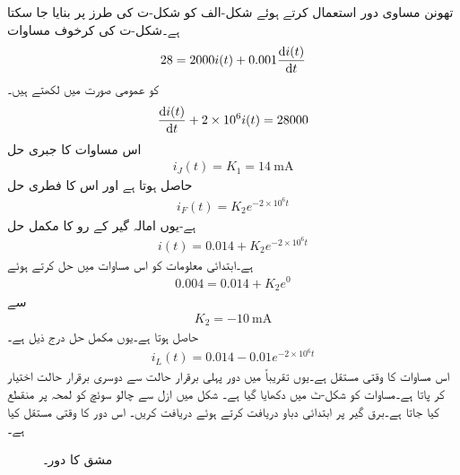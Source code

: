 تھونن مساوی دور استعمال کرتے ہوئے شکل-الف کو شکل-ت کی طرز پر بنایا جا سکتا ہے۔شکل-ت کی کرخوف مساوات
\begin{align*}
28=2000 i(t)+0.001 \frac{\dif i(t)}{\dif t}
\end{align*}
کو عمومی صورت میں لکھتے ہیں۔
\begin{align*}
\frac{\dif i(t)}{\dif t}+2\times 10^6 i(t)=28000
\end{align*}
اس مساوات کا جبری حل 
\begin{align*}
i_J(t)=K_1=\SI{14}{\milli\ampere}
\end{align*}
حاصل ہوتا ہے اور اس کا فطری حل
\begin{align*}
i_F(t)=K_2 e^{-2\times 10^6 t}
\end{align*}
ہے-یوں امالہ گیر کے رو کا مکمل حل
\begin{align*}
i(t)=0.014+K_2 e^{-2\times 10^6 t}
\end{align*}
ہے۔ابتدائی معلومات کو اس مساوات میں حل کرتے ہوئے
\begin{align*}
0.004=0.014+K_2 e^{0}
\end{align*}
سے
\begin{align*}
K_2=\SI{-10}{\milli\ampere}
\end{align*}
حاصل ہوتا ہے۔یوں مکمل حل درج ذیل ہے۔
\begin{align}\label{مساوات_عارضی_امالہ_گیر_مکمل_حل_ب}
i_L(t)=0.014-0.01e^{-2\times 10^6 t}
\end{align} 
اس مساوات کا وقتی مستقل  ہے۔یوں تقریباً  میں دور پہلی برقرار حالت سے دوسری برقرار حالت اختیار کر پاتا ہے۔مساوات  کو شکل-ٹ میں دکھایا گیا ہے۔
شکل  میں ازل سے چالو سوئچ کو  لمحہ  پر منقطع کیا جاتا ہے۔برق گیر پر ابتدائی دباو دریافت کرتے ہوئے  دریافت کریں۔ اس دور کا وقتی مستقل کیا ہے۔
\begin{figure}
\centering
{}
\caption{مشق  کا دور۔}
\label{شکل_عارضی_مشق_برق_گیر_الف}
\end{figure}

